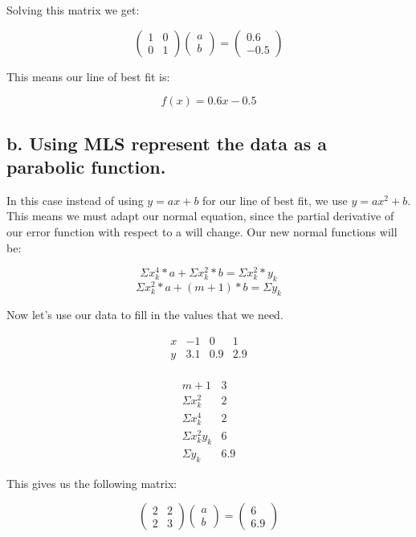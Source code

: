\documentclass[]{article}
\begin{document}
Solving this matrix we get:

\[
\left(\begin{array}{cc} 
1 & 0\\
0 & 1
\end{array}\right)
\left(\begin{array}{c} 
a \\
b 
\end{array}\right) =
\left(\begin{array}{c}
0.6 \\
-0.5 
\end{array}\right)
\]

This means our line of best fit is:

\[f(x) = 0.6x - 0.5\]

\subsection{b. Using MLS represent the data as a parabolic
function.}\label{b.-using-mls-represent-the-data-as-a-parabolic-function.}

In this case instead of using \(y = ax + b\) for our line of best fit,
we use \(y = ax^2 + b\). This means we must adapt our normal equation,
since the partial derivative of our error function with respect to a
will change. Our new normal functions will be:

\[\Sigma x_k^4*a + \Sigma x_k^2 * b = \Sigma x_k^2 * y_k\]
\[\Sigma x_k^2 * a + (m + 1)*b = \Sigma y_k\]

Now let's use our data to fill in the values that we need.

\[
\begin{array}{c|c|c|c|} 
x & -1 & 0 & 1\\
y & 3.1 & 0.9 & 2.9\\
\end{array}
\]

\[
\begin{array}{c|c|} 
m+1 & 3\\
\Sigma x_k^2 & 2\\
\Sigma x_k^4 & 2\\
\Sigma x_k^2y_k & 6\\
\Sigma y_k & 6.9
\end{array}
\]

This gives us the following matrix:

\[
\left(\begin{array}{cc} 
2 & 2\\
2 & 3
\end{array}\right)
\left(\begin{array}{c} 
a \\
b 
\end{array}\right) =
\left(\begin{array}{c}
6 \\
6.9 
\end{array}\right)
\]
\end{document}
